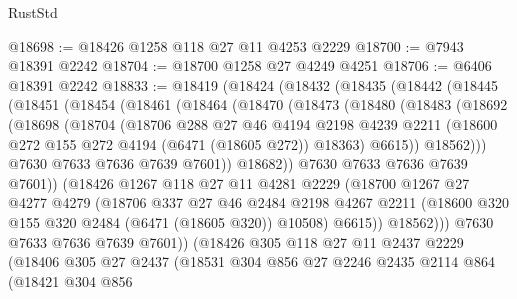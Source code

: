 \begin{lexlean}{RustStd}
\begin{coremodule}
{\begin{coremodule}
{{{{{{{{{{{{{{{{{{{{{{{{{{@18698 := @18426 @1258 @118 @27 @11 @4253 @2229
@18700 := @7943 @18391 @2242
@18704 := @18700 @1258 @27 @4249 @4251
@18706 := @6406 @18391 @2242
@18833 := @18419
    (@18424
      (@18432
        (@18435
          (@18442
            (@18445
              (@18451
                (@18454
                  (@18461
                    (@18464
                      (@18470
                        (@18473
                          (@18480
                            (@18483
                              (@18692
                                (@18698
                                  (@18704
                                    (@18706
                                      @288
                                      @27
                                      @46
                                      @4194
                                      @2198
                                      @4239
                                      @2211
                                      (@18600 @272 @155 @272 @4194 (@6471 (@18605 @272)) @18363)
                                      @6615))
                                  @18562)))
                            @7630
                            @7633
                            @7636
                            @7639
                            @7601))
                        @18682))
                    @7630
                    @7633
                    @7636
                    @7639
                    @7601))
                (@18426
                  @1267
                  @118
                  @27
                  @11
                  @4281
                  @2229
                  (@18700
                    @1267
                    @27
                    @4277
                    @4279
                    (@18706
                      @337
                      @27
                      @46
                      @2484
                      @2198
                      @4267
                      @2211
                      (@18600 @320 @155 @320 @2484 (@6471 (@18605 @320)) @10508)
                      @6615))
                  @18562)))
            @7630
            @7633
            @7636
            @7639
            @7601))
        (@18426
          @305
          @118
          @27
          @11
          @2437
          @2229
          (@18406
            @305
            @27
            @2437
            (@18531
              @304
              @856
              @27
              @2246
              @2435
              @2114
              @864
              (@18421
                @304
                @856
}}}}}}}}}}}}}}}}}}}}}}}}}}
\end{coremodule}}
\end{coremodule}
\end{lexlean}
